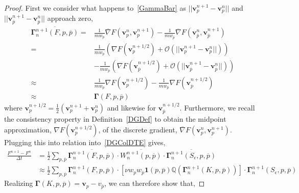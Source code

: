 \documentclass[10pt,a4paper]{amsart}
\begin{document}
\begin{proof}
First we consider what happens to~\eqref{GammaBar} as $||\boldsymbol{v}_{p}^{n+1} - \boldsymbol{v}_{p}^{n}||$ and $||\boldsymbol{v}_{\overline{p}}^{n+1} - \boldsymbol{v}_{\overline{p}}^{n}||$ approach zero, 
\begin{align*}
\overline{\boldsymbol{\Gamma}_{n}^{n+1}(F, p, \overline{p})}=&\frac{1}{m w_{p}} \overline{\nabla} F (\boldsymbol{v}_{p}^{n},\boldsymbol{v}_{p}^{n+1})-\frac{1}{m w_{\overline{p}}} \overline{\nabla} F (\boldsymbol{v}_{\overline{p}}^{n},\boldsymbol{v}_{\overline{p}}^{n+1})\\
= &\frac{1}{m w_{p}} \left( \nabla F \left( \boldsymbol{v}_{p}^{n+1/2} \right) + \mathcal{O} (||\boldsymbol{v}_{p}^{n+1} - \boldsymbol{v}_{p}^{n}||) \right) \\
&- \frac{1}{m w_{\overline{p}}} \left( \nabla F \left( \boldsymbol{v}_{\overline{p}}^{n+1/2} \right) + \mathcal{O} (||\boldsymbol{v}_{\overline{p}}^{n+1} - \boldsymbol{v}_{\overline{p}}^{n}||) \right)\\
\approx &\frac{1}{m w_{p}} \nabla F \left( \boldsymbol{v}_{p}^{n+1/2} \right) - \frac{1}{m w_{\overline{p}}} \nabla F \left( \boldsymbol{v}_{\overline{p}}^{n+1/2} \right)\\
\approx & \boldsymbol{\Gamma} (F, p, \overline{p})
\end{align*}
where $\boldsymbol{v}_p^{n+1/2}=\frac{1}{2}\left(\boldsymbol{v}_p^{n+1}+\boldsymbol{v}_p^{n}\right)$ and likewise for $\boldsymbol{v}_{\bar{p}}^{n+1/2}$. Furthermore, we recall the consistency property in Definition~\eqref{DGDef} to obtain the midpoint approximation, $\nabla F(\boldsymbol{v}_p^{n+1/2})$, of the discrete gradient, $\overline{\nabla} F (\boldsymbol{v}_{p}^{n},\boldsymbol{v}_{p}^{n+1})$. Plugging this into relation into~\eqref{DGColDTE} gives,
\begin{align*}
\frac{F^{n+1} - F^{n}}{\Delta t} &= \frac{1}{2} \sum_{p,\overline{p}} \overline{\boldsymbol{\Gamma}^{n+1}_{n} (F,p,\overline{p})} \cdot \overline{W^{n+1}_{n} (p,\overline{p})} \cdot \overline{\boldsymbol{\Gamma}^{n+1}_{n} (S_{\epsilon},p,\overline{p})} \\
&\approx \frac{1}{2} \sum_{p,\overline{p}} \boldsymbol{\Gamma}^{n+1}_{n} (F,p,\overline{p}) \cdot \left[ \nu w_{p} w_{\overline{p}} \boldsymbol{1}(p, \overline{p}) \mathbb{Q}\left(\boldsymbol{\Gamma}_{n}^{n+1}(K, p, \overline{p})\right) \right] \cdot \boldsymbol{\Gamma}^{n+1}_{n} (S_{\epsilon},p,\overline{p})
\end{align*}
Realizing $\boldsymbol{\Gamma}(K,p,\overline{p}) = \boldsymbol{v}_p - v_{\overline{p}}$, we can therefore show that,

\end{proof}
\end{document}
